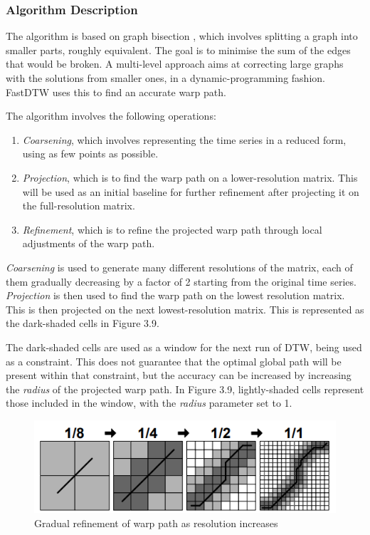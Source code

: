 \documentclass[final,rdr32.tex]{subfiles}
\begin{document}
\subsubsection{Algorithm Description}

The algorithm is based on graph bisection \cite{karypis1997multilevel}, which involves splitting a graph into smaller parts, roughly equivalent. The goal is to minimise the sum of the edges that would be broken. A multi-level approach aims at correcting large graphs with the solutions from smaller ones, in a dynamic-programming fashion. FastDTW uses this to find an accurate warp path.

The algorithm involves the following operations:
\begin{enumerate}
    \item \textit{Coarsening}, which involves representing the time series in a reduced form, using as few points as possible.
    \item \textit{Projection}, which is to find the warp path on a lower-resolution matrix. This will be used as an initial baseline for further refinement after projecting it on the full-resolution matrix.
    \item \textit{Refinement}, which is to refine the projected warp path through local adjustments of the warp path.
\end{enumerate}

\textit{Coarsening} is used to generate many different resolutions of the matrix, each of them gradually decreasing by a factor of 2 starting from the original time series. \textit{Projection} is then used to find the warp path on the lowest resolution matrix. This is then projected on the next lowest-resolution matrix. This is represented as the dark-shaded cells in Figure 3.9.

The dark-shaded cells are used as a window for the next run of DTW, being used as a constraint. This does not guarantee that the optimal global path will be present within that constraint, but the accuracy can be increased by increasing the \textit{radius} of the projected warp path. In Figure 3.9, lightly-shaded cells represent those included in the window, with the \textit{radius} parameter set to 1.

\begin{figure}[H]
    \begin{center}
        \includegraphics[scale=1]{images/fastdtw.png}
        \caption{Gradual refinement of warp path as resolution increases}
    \end{center}
\end{figure}
\end{document}
